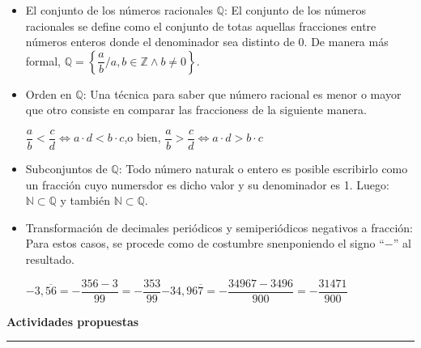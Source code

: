 \documentclass[spanish,letterpaper, 11pt, addpoints, answers]{exam}
\begin{document}
\begin{itemize}
  \item El conjunto de los números racionales $\mathbb{Q}$: El conjunto de los números racionales se define como el conjunto de totas aquellas fracciones entre números enteros donde el denominador sea distinto de 0. De manera más formal, $\mathbb{Q}=\left\{\dfrac{a}{b} / a,b \in\mathbb{Z} \wedge b\neq 0\right\}$.
  \item Orden en $\mathbb{Q}$: Una técnica para saber que número racional es menor o mayor que otro consiste en comparar las fraccioness de la siguiente manera.
        \begin{center}
          $\dfrac{a}{b}<\dfrac{c}{d}\Leftrightarrow a\cdot d < b\cdot c$,\hspace{0.5cm}o bien,\hspace{0.5cm}    $\dfrac{a}{b}>\dfrac{c}{d}\Leftrightarrow a\cdot d > b\cdot c$
        \end{center}
  \item Subconjuntos de $\mathbb{Q}$: Todo número naturak o entero es posible escribirlo como un fracción cuyo numersdor es dicho valor y su denominador es 1. Luego: $\mathbb{N}\subset \mathbb{Q}$ y también $\mathbb{N}\subset \mathbb{Q}$.
  \item Transformación de decimales periódicos y semiperiódicos negativos a fracción: Para estos casos, se procede como de costumbre snenponiendo el signo ``$-$'' al resultado.
        \begin{center}
          $-3{,}\overline{56}=-\dfrac{356-3}{99}=-\dfrac{353}{99}$\hspace{2cm}$-34{,}96\overline{7}=-\dfrac{34967-3496}{900}=-\dfrac{31471}{900}$
        \end{center}
\end{itemize}

\parbox{6in}{
  \textbf{Actividades propuestas}}
\vspace{0.15in}
\hrule
\end{document}
